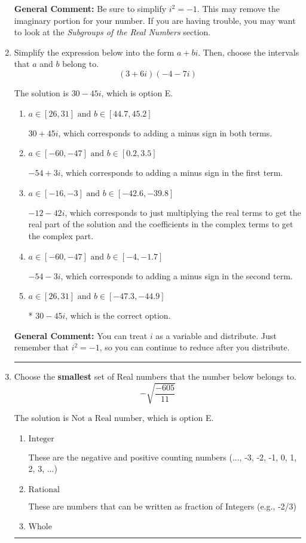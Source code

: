 \documentclass{extbook}[14pt]
\newcommand{\litem}[1]{\item #1

\rule{\textwidth}{0.4pt}}
\begin{document}
\begin{enumerate}
{\textbf{General Comment:} Be sure to simplify $i^2 = -1$. This may remove the imaginary portion for your number. If you are having trouble, you may want to look at the \textit{Subgroups of the Real Numbers} section.
}
\litem{
Simplify the expression below into the form $a+bi$. Then, choose the intervals that $a$ and $b$ belong to.
\[ (3 + 6 i)(-4 - 7 i) \]

The solution is \( 30 - 45 i \), which is option E.\begin{enumerate}[label=\Alph*.]
\item \( a \in [26, 31] \text{ and } b \in [44.7, 45.2] \)

 $30 + 45 i$, which corresponds to adding a minus sign in both terms.
\item \( a \in [-60, -47] \text{ and } b \in [0.2, 3.5] \)

 $-54 + 3 i$, which corresponds to adding a minus sign in the first term.
\item \( a \in [-16, -3] \text{ and } b \in [-42.6, -39.8] \)

 $-12 - 42 i$, which corresponds to just multiplying the real terms to get the real part of the solution and the coefficients in the complex terms to get the complex part.
\item \( a \in [-60, -47] \text{ and } b \in [-4, -1.7] \)

 $-54 - 3 i$, which corresponds to adding a minus sign in the second term.
\item \( a \in [26, 31] \text{ and } b \in [-47.3, -44.9] \)

* $30 - 45 i$, which is the correct option.
\end{enumerate}

\textbf{General Comment:} You can treat $i$ as a variable and distribute. Just remember that $i^2=-1$, so you can continue to reduce after you distribute.
}
\litem{
Choose the \textbf{smallest} set of Real numbers that the number below belongs to.
\[ -\sqrt{\frac{-605}{11}} \]

The solution is \( \text{Not a Real number} \), which is option E.\begin{enumerate}[label=\Alph*.]
\item \( \text{Integer} \)

These are the negative and positive counting numbers (..., -3, -2, -1, 0, 1, 2, 3, ...)
\item \( \text{Rational} \)

These are numbers that can be written as fraction of Integers (e.g., -2/3)
\item \( \text{Whole} \)


\end{enumerate}}
\end{enumerate}
\end{document}
